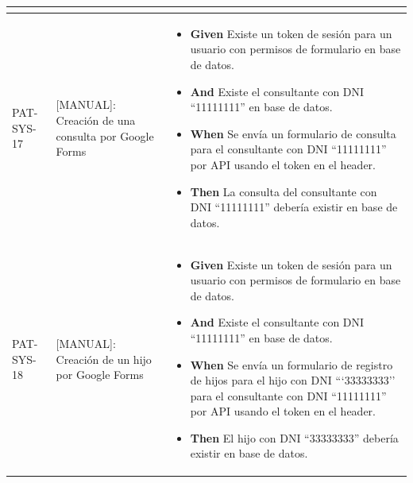 \begin{longtable}{|p{1cm}|p{2.5cm}|p{12cm}|}
\begin{itemize}
    \end{itemize}
    \\
    \hline
    PAT-SYS-17 & [MANUAL]: Creación de una consulta por Google Forms & 
    \begin{itemize}
        \item \textbf{Given} Existe un token de sesión para un usuario con permisos de formulario en base de datos.
        \item \textbf{And} Existe el consultante con DNI ``11111111'' en base de datos.
        \newline
        \item \textbf{When} Se envía un formulario de consulta para el consultante con DNI ``11111111'' por API usando el token en el header.
        \newline
        \item \textbf{Then} La consulta del consultante con DNI ``11111111'' debería existir en base de datos.
    \end{itemize}
    \\
    \hline
    PAT-SYS-18 & [MANUAL]: Creación de un hijo por Google Forms & 
    \begin{itemize}
        \item \textbf{Given} Existe un token de sesión para un usuario con permisos de formulario en base de datos.
        \item \textbf{And} Existe el consultante con DNI ``11111111'' en base de datos.
        \newline
        \item \textbf{When} Se envía un formulario de registro de hijos para el hijo con DNI ```33333333'' para el consultante con DNI ``11111111'' por API usando el token en el header.
        \newline
        \item \textbf{Then} El hijo con DNI ``33333333'' debería existir en base de datos.
    \end{itemize}
    \\
    \hline
\end{longtable}
